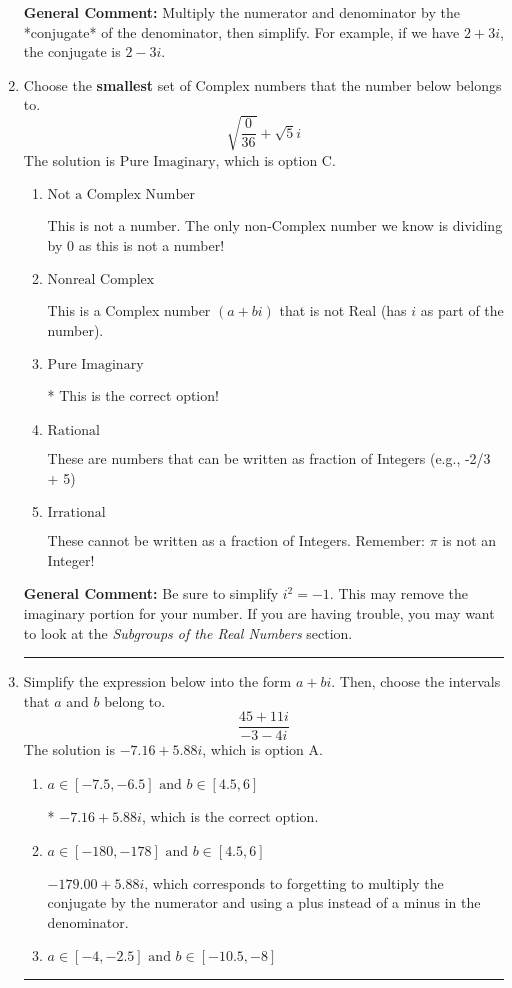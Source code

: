 \documentclass{extbook}[14pt]
\newcommand{\litem}[1]{\item #1

\rule{\textwidth}{0.4pt}}
\begin{document}
\begin{enumerate}
{\textbf{General Comment:} Multiply the numerator and denominator by the *conjugate* of the denominator, then simplify. For example, if we have $2+3i$, the conjugate is $2-3i$.
}
\litem{
Choose the \textbf{smallest} set of Complex numbers that the number below belongs to.
\[ \sqrt{\frac{0}{36}}+\sqrt{5}i \]
The solution is \( \text{Pure Imaginary} \), which is option C.\begin{enumerate}[label=\Alph*.]
\item \( \text{Not a Complex Number} \)

This is not a number. The only non-Complex number we know is dividing by 0 as this is not a number!
\item \( \text{Nonreal Complex} \)

This is a Complex number $(a+bi)$ that is not Real (has $i$ as part of the number).
\item \( \text{Pure Imaginary} \)

* This is the correct option!
\item \( \text{Rational} \)

These are numbers that can be written as fraction of Integers (e.g., -2/3 + 5)
\item \( \text{Irrational} \)

These cannot be written as a fraction of Integers. Remember: $\pi$ is not an Integer!
\end{enumerate}

\textbf{General Comment:} Be sure to simplify $i^2 = -1$. This may remove the imaginary portion for your number. If you are having trouble, you may want to look at the \textit{Subgroups of the Real Numbers} section.
}
\litem{
Simplify the expression below into the form $a+bi$. Then, choose the intervals that $a$ and $b$ belong to.
\[ \frac{45 + 11 i}{-3 - 4 i} \]
The solution is \( -7.16  + 5.88 i \), which is option A.\begin{enumerate}[label=\Alph*.]
\item \( a \in [-7.5, -6.5] \text{ and } b \in [4.5, 6] \)

* $-7.16  + 5.88 i$, which is the correct option.
\item \( a \in [-180, -178] \text{ and } b \in [4.5, 6] \)

 $-179.00  + 5.88 i$, which corresponds to forgetting to multiply the conjugate by the numerator and using a plus instead of a minus in the denominator.
\item \( a \in [-4, -2.5] \text{ and } b \in [-10.5, -8] \)


\end{enumerate}}
\end{enumerate}
\end{document}
